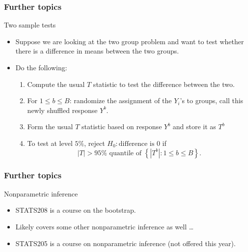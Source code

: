 \documentclass[handout]{beamer}
\begin{document}
   \begin{frame} \frametitle{Further topics}

   \begin{block}
   {Two sample tests}

   \begin{itemize}
   \item Suppose we are looking at the two group problem
   and want to test whether there is a difference in means
   between the two groups.
   \item Do the following:
   \begin{enumerate}
   \item Compute the usual $T$ statistic to test the difference
   between the two.
   \item For $1 \leq b \leq B$: randomize
   the assignment of the $Y_i$'s to groups, call this
   newly shuffled response $Y^b$.
   \item Form the usual $T$ statistic based on response
   $Y^b$ and store it as $T^b$
   \item To test at level $5\%$, reject $H_0: \text{difference is 0}$ if
   $$
   |T| > \text{$95\%$ quantile of $\left\{|T^b|: 1 \leq b \leq B \right\}$}.
   $$
   \end{enumerate}
   \end{itemize}
   \end{block}
   \end{frame}


   \begin{frame} \frametitle{Further topics}

   \begin{block}
   {Nonparametric inference}

   \begin{itemize}
   \item STATS208 is a course on the bootstrap.

   \item Likely covers some other nonparametric inference as well \dots

   \item STATS205 is a course on nonparametric inference (not offered this
   year).
   \end{itemize}
   \end{block}
   \end{frame}

\end{document}
